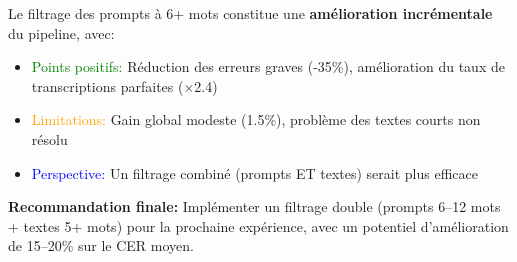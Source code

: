 \documentclass[12pt,a4paper]{article}
\begin{document}
Le filtrage des prompts à 6+ mots constitue une \textbf{amélioration incrémentale} du pipeline, avec:
\begin{itemize}
    \item \textcolor{green}{Points positifs:} Réduction des erreurs graves (-35\%), amélioration du taux de transcriptions parfaites ($\times$2.4)
    \item \textcolor{orange}{Limitations:} Gain global modeste (1.5\%), problème des textes courts non résolu
    \item \textcolor{blue}{Perspective:} Un filtrage combiné (prompts ET textes) serait plus efficace
\end{itemize}

\textbf{Recommandation finale:} Implémenter un filtrage double (prompts 6--12 mots + textes 5+ mots) pour la prochaine expérience, avec un potentiel d'amélioration de 15--20\% sur le CER moyen.
\end{document}

